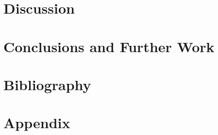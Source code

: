 \documentclass[
  ieee        %
]{uob-thesis}
\begin{document}
\chapter{Discussion}
\label{chapter9}
% 

\chapter{Conclusions and Further Work}
\label{chapter10}
% 



\backmatter

\chapter*{Bibliography}
\printbibliography[heading=none]

\appendix
\chapter{Appendix}
\label{appendix}

\end{document}
